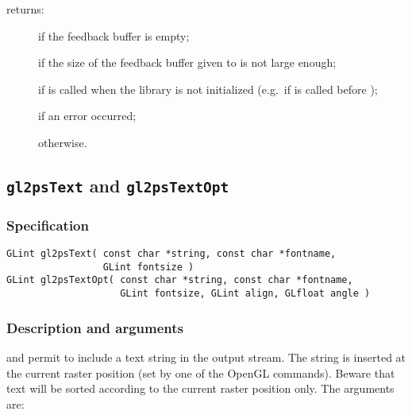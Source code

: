 \noindent{} returns:
\begin{description}
\item[] if the feedback buffer is empty;
\item[] if the size of the feedback buffer given to
 is not large enough;
\item[] if  is called when the
library is not initialized (e.g.\ if  is called before
);
\item[] if an error occurred;
\item[] otherwise.
\end{description}


\subsection{\texttt{gl2psText} and \texttt{gl2psTextOpt}}
\label{sec:gl2psText}

\subsubsection{Specification}

\begin{verbatim}
GLint gl2psText( const char *string, const char *fontname,
                 GLint fontsize )
GLint gl2psTextOpt( const char *string, const char *fontname,
                    GLint fontsize, GLint align, GLfloat angle )
\end{verbatim}

\subsubsection{Description and arguments}

 and  permit to include a text string
in the output stream. The string is inserted at the current raster
position (set by one of the  OpenGL commands). Beware
that text will be sorted according to the current raster position
only. The arguments are:

